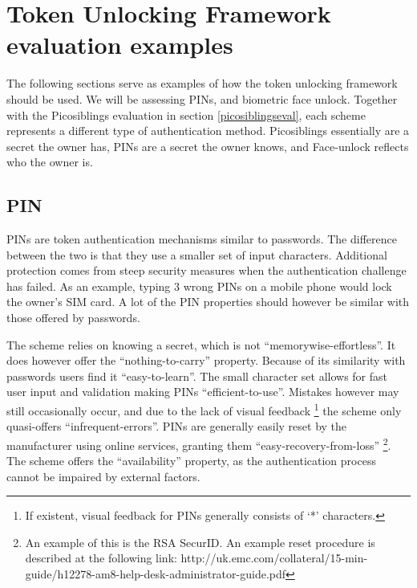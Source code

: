 
\chapter{Token Unlocking Framework evaluation examples} %

\label{AppendixB} %


The following sections serve as examples of how the token unlocking framework should be used. We will be assessing PINs, and biometric face unlock. Together with the Picosiblings evaluation in section \ref{picosiblingseval}, each scheme represents a different type of authentication method. Picosiblings essentially are a secret the owner has, PINs are a secret the owner knows, and Face-unlock reflects who the owner is. 

%
%
\section*{PIN}
PINs are token authentication mechanisms similar to passwords. The difference between the two is that they use a smaller set of input characters. Additional protection comes from steep security measures when the authentication challenge has failed. As an example, typing 3 wrong PINs on a mobile phone would lock the owner's SIM card. A lot of the PIN properties should however be similar with those offered by passwords.
	
The scheme relies on knowing a secret, which is not ``memorywise-effortless''. It does however offer the ``nothing-to-carry'' property. Because of its similarity with passwords users find it ``easy-to-learn''. The small character set allows for fast user input and validation making PINs ``efficient-to-use''. Mistakes however may still occasionally occur, and due to the lack of visual feedback \footnote{If existent, visual feedback for PINs generally consists of `*' characters.} the scheme only quasi-offers ``infrequent-errors''. PINs are generally easily reset by the manufacturer using online services, granting them ``easy-recovery-from-loss'' \footnote{An example of this is the RSA SecurID. An example reset procedure is described at the following link: http://uk.emc.com/collateral/15-min-guide/h12278-am8-help-desk-administrator-guide.pdf}. The scheme offers the ``availability'' property, as the authentication process cannot be impaired by external factors.
	
